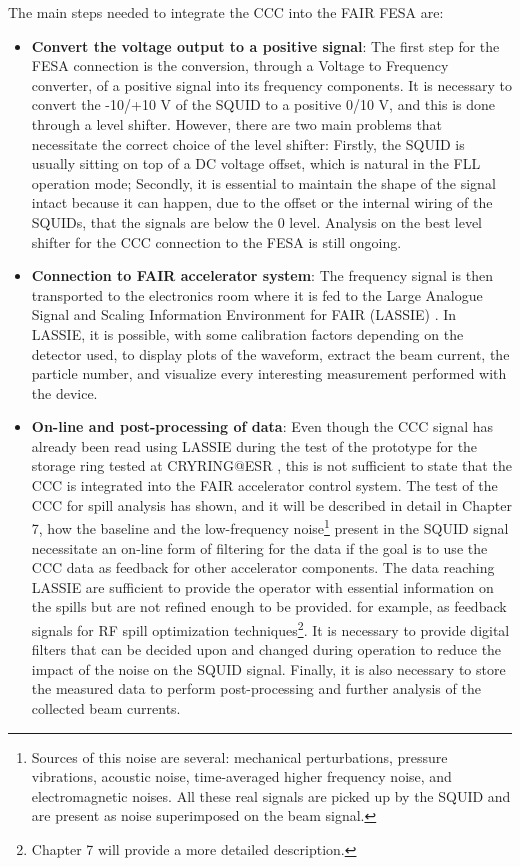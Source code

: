 \documentclass[12pt,a4paper]{report}
\begin{document}
       The main steps needed to integrate the CCC into the FAIR FESA are:
       \begin{itemize}
       	\item \textbf{Convert the voltage output to a positive signal}: The first step for the FESA connection is the conversion, through a Voltage to Frequency converter, of a positive signal into its frequency components. It is necessary to convert the -10/+10 V of the SQUID to a positive 0/10 V, and this is done through a level shifter. However, there are two main problems that necessitate the correct choice of the level shifter: Firstly, the SQUID is usually sitting on top of a DC voltage offset, which is natural in the FLL operation mode; Secondly, it is essential to maintain the shape of the signal intact because it can happen, due to the offset or the internal wiring of the SQUIDs, that the signals are below the 0 level. Analysis on the best level shifter for the CCC connection to the FESA is still ongoing.
       	
       	\item \textbf{Connection to FAIR accelerator system}: The frequency signal is then transported to the electronics room where it is fed to the Large Analogue Signal and Scaling Information Environment for FAIR (LASSIE) \cite{LASSIE}. In LASSIE, it is possible, with some calibration factors depending on the detector used, to display plots of the waveform, extract the beam current, the particle number, and visualize every interesting measurement performed with the device.
       	
       	\item \textbf{On-line and post-processing of data}: Even though the CCC signal has already been read using LASSIE during the test of the prototype for the storage ring tested at CRYRING@ESR \cite{DavidThesis}, this is not sufficient to state that the CCC is integrated into the FAIR accelerator control system. The test of the CCC for spill analysis has shown, and it will be described in detail in Chapter 7, how the baseline and the low-frequency noise\footnote{Sources of this noise are several: mechanical perturbations, pressure vibrations, acoustic noise, time-averaged higher frequency noise, and electromagnetic noises. All these real signals are picked up by the SQUID and are present as noise superimposed on the beam signal.} present in the SQUID signal necessitate an on-line form of filtering for the data if the goal is to use the CCC data as feedback for other accelerator components. The data reaching LASSIE are sufficient to provide the operator with essential information on the spills but are not refined enough to be provided. for example, as feedback signals for RF spill optimization techniques\footnote{Chapter 7 will provide a more detailed description.}. It is necessary to provide digital filters that can be decided upon and changed during operation to reduce the impact of the noise on the SQUID signal. Finally, it is also necessary to store the measured data to perform post-processing and further analysis of the collected beam currents.
       	

\end{itemize}
\end{document}

